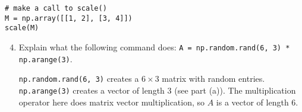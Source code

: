 \documentclass{article}
\newcounter{points}
\newcommand\printpoints{Total number of points: \thepoints}
\begin{document}
\begin{enumerate}
\begin{enumerate}
\begin{lstlisting}
# make a call to scale()
M = np.array([[1, 2], [3, 4]])
scale(M)
\end{lstlisting}
\end{enumerate}

\begin{enumerate}
\setcounter{enumii}{3}
\item Explain what the following command does: \texttt{A = np.random.rand(6, 3) * np.arange(3)}. \\ \vspace{0.1in}

\texttt{np.random.rand(6, 3)} creates a $6 \times 3$ matrix with random entries.  \texttt{np.arange(3)} creates a vector of length $3$ (see part (a)).  The multiplication operator here does matrix vector multiplication, so $A$ is a vector of length $6$.
\end{enumerate}




\end{enumerate}
\end{document}
